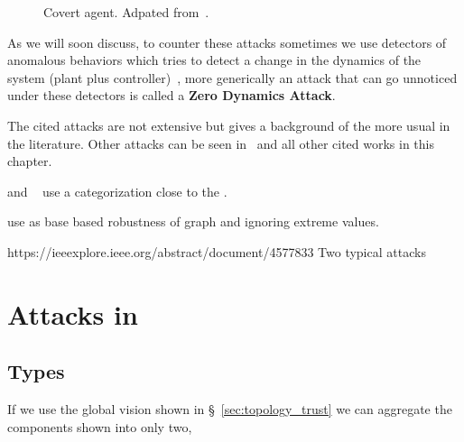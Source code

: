\documentclass[../main.tex]{subfiles}
\begin{document}
\begin{figure}[h]
\caption[Covert agent.]{Covert agent. Adpated from~\cite{Smith2015,BarboniEtAl2020}.}\label{fig:covert_attack}
\end{figure}

As we will soon discuss, to counter these attacks sometimes we use detectors of anomalous behaviors which tries to detect a change in the dynamics of the system (plant plus controller)~\cite{TeixeiraEtAl2012,TeixeiraEtAl2015,HoehnZhang2016}, more generically an attack that can go unnoticed under these detectors is called a \textbf{Zero Dynamics Attack}.

The cited attacks are not extensive but gives a background of the more usual in the literature.
Other attacks can be seen in~\cite{TeixeiraEtAl2015,ZhangEtAl2021c} and all other cited works in this chapter.

\cite{DibajiEtAl2019} and ~ use a categorization close to the \CIA{}.

use as base
\cite{MaestreEtAl2018}
\cite{DibajiIshii2015,WangIshii2019,VelardeEtAl2018} based robustness of graph and ignoring extreme values.

https://ieeexplore.ieee.org/abstract/document/4577833
\cite{CaiEtAl2019,ZhangEtAl2021b}
Two typical attacks \cite{ZhangEtAl2021a}

\section{Attacks in \dmpc{}}\label{sec:attacks_in_dmpc}

\subsection{Types}\label{sec:types_of_attacks}
If we use the global vision shown in \S~\ref{sec:topology_trust} we can aggregate the components shown into only two,
\cite{PasqualettiEtAl2013}
\cite{BoemEtAl2020}
\end{document}

